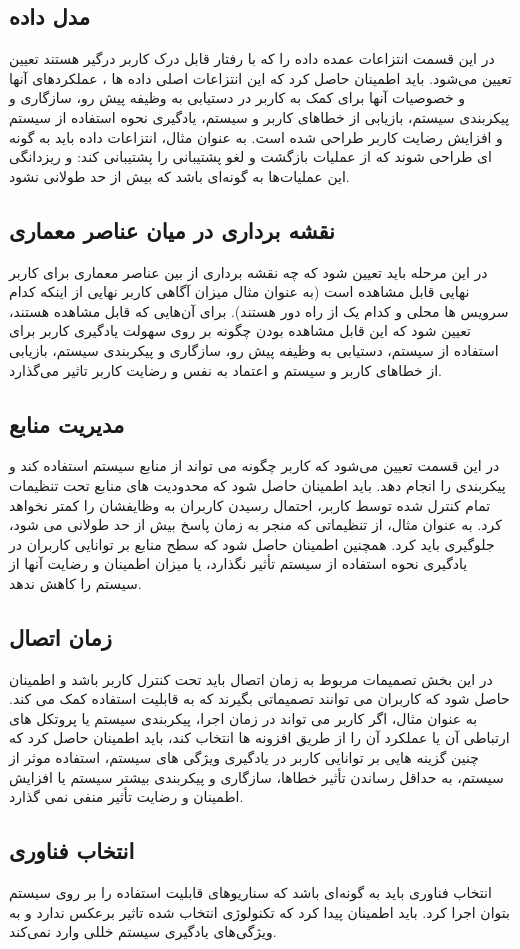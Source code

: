 \subsection{مدل داده}
در این قسمت انتزاعات عمده داده را که با رفتار قابل درک کاربر درگیر هستند تعیین تعیین می‌شود.
باید اطمینان حاصل کرد که این انتزاعات اصلی داده ها ، عملکردهای آنها و خصوصیات آنها برای کمک به کاربر در دستیابی به وظیفه پیش رو، سازگاری و پیکربندی سیستم، بازیابی از خطاهای کاربر و سیستم، یادگیری نحوه استفاده از سیستم و افزایش رضایت کاربر طراحی شده است.
به عنوان مثال، انتزاعات داده باید به گونه ای طراحی شوند که از عملیات بازگشت و لغو پشتیبانی را پشتیبانی کند: و ریزدانگی این عملیات‌ها به گونه‌ای باشد که بیش از حد طولانی نشود.
\subsection{نقشه برداری در میان عناصر معماری}
در این مرحله باید تعیین شود که چه نقشه برداری از بین عناصر معماری برای کاربر نهایی قابل مشاهده است (به عنوان مثال میزان آگاهی کاربر نهایی از اینکه کدام سرویس ها محلی و کدام یک از راه دور هستند).
برای آن‌هایی که قابل مشاهده هستند، تعیین شود که این قابل مشاهده بودن چگونه بر روی سهولت یادگیری کاربر برای استفاده از سیستم، دستیابی به وظیفه پیش رو، سازگاری و پیکربندی سیستم، بازیابی از خطاهای کاربر و سیستم و اعتماد به نفس و رضایت کاربر تاثیر می‌گذارد.
\subsection{مدیریت منابع}
در این قسمت تعیین می‌شود که کاربر چگونه می تواند از منابع سیستم استفاده کند و پیکربندی را انجام دهد.
باید اطمینان حاصل شود که محدودیت های منابع تحت تنظیمات تمام کنترل شده توسط کاربر، احتمال رسیدن کاربران به وظایفشان را کمتر نخواهد کرد. به عنوان مثال، از تنظیماتی که منجر به زمان پاسخ بیش از حد طولانی می شود، جلوگیری باید کرد.
همچنین اطمینان حاصل شود که سطح منابع بر توانایی کاربران در یادگیری نحوه استفاده از سیستم تأثیر نگذارد، یا میزان اطمینان و رضایت آنها از سیستم را کاهش ندهد.
\subsection{زمان اتصال}
در این بخش تصمیمات مربوط به زمان اتصال باید تحت کنترل کاربر باشد و اطمینان حاصل شود که کاربران می توانند تصمیماتی بگیرند که به قابلیت استفاده کمک می کند.
به عنوان مثال، اگر کاربر می تواند در زمان اجرا، پیکربندی سیستم یا پروتکل های ارتباطی آن یا عملکرد آن را از طریق افزونه ها انتخاب کند، باید اطمینان حاصل کرد که چنین گزینه هایی بر توانایی کاربر در یادگیری ویژگی های سیستم، استفاده موثر از سیستم، به حداقل رساندن تأثیر خطاها، سازگاری و پیکربندی بیشتر سیستم یا افزایش اطمینان و رضایت 
تأثیر منفی نمی گذارد.
\subsection{انتخاب فناوری}
انتخاب فناوری باید به گونه‌ای باشد که سناریو‌های قابلیت استفاده را بر روی سیستم بتوان اجرا کرد.
باید اطمینان پیدا کرد که تکنولوژی انتخاب شده تاثیر برعکس ندارد و به ویژگی‌های یادگیری سیستم خللی وارد نمی‌کند. 
